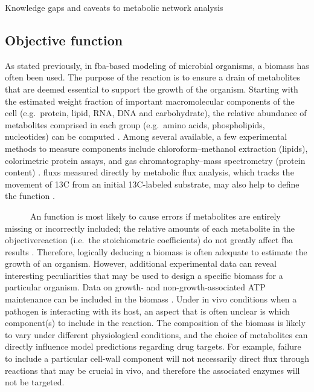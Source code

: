 \begin{pabox}[label=trends:box:caveats]{Knowledge gaps and caveats to metabolic network analysis}
\subsection*{Objective function}
As stated previously, in \gls{fba}-based modeling of microbial organisms, 
a \gls{biomass} has often been used. The purpose of 
the reaction is to ensure a drain of metabolites that 
are deemed essential to support the growth of the 
organism. Starting with the estimated weight fraction 
of important macromolecular components of the cell 
(e.g.\ protein, lipid, RNA, DNA and carbohydrate), the 
relative abundance of metabolites comprised in each 
group (e.g.\ amino acids, phospholipids, nucleotides) 
can be computed \cite{Feist:2010hq}. Among several available, a few 
experimental methods to measure  components 
include chloroform–methanol extraction (lipids), 
colorimetric protein assays, and gas chromatography–mass 
spectrometry (protein content) \cite{Boyle:2009jr}. \Glspl{flux} measured 
directly by metabolic flux analysis, which tracks 
the movement of 13C from an initial 13C-labeled 
substrate, may also help to define the  
function \cite{Chen:2011dj,Blank:2005bt}.

~~~~~~An  function is most likely to cause 
errors if metabolites are entirely missing or 
incorrectly included; the relative amounts of each 
metabolite in the \gls{objectivereaction} (i.e.\ the 
stoichiometric coefficients) do not greatly affect 
\gls{fba} results \cite{Varma:1993hd,Varma:1994tb}. Therefore, logically 
deducing a \gls{biomass} is often adequate 
to estimate the growth of an organism. However, 
additional experimental data can reveal interesting 
peculiarities that may be used to design a specific 
\gls{biomass} for a particular organism. 
Data on growth- and non-growth-associated ATP 
maintenance can be included in the \gls{biomass} \cite{Forster:2003jb}. Under in vivo conditions when a 
pathogen is interacting with its host, an aspect 
that is often unclear is which  component(s) 
to include in the reaction. The composition of the 
\gls{biomass} is likely to vary under different 
physiological conditions, and the choice of metabolites 
can directly influence model predictions regarding 
drug targets. For example, failure to include a 
particular cell-wall component will not necessarily 
direct \gls{flux} through reactions that may be crucial in 
vivo, and therefore the associated enzymes will not 
be targeted.
\end{pabox}

